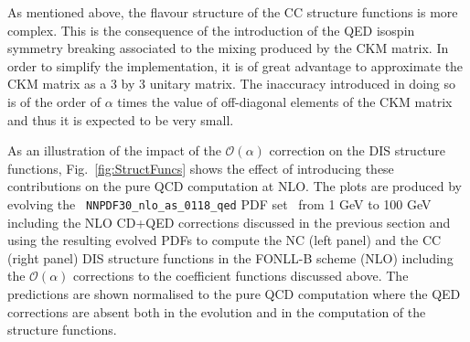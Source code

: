 As mentioned above, the flavour structure of the CC structure
functions is more complex. This is the consequence of the introduction
of the QED isospin symmetry breaking associated to the mixing produced
by the CKM matrix. In order to simplify the implementation, it is of
great advantage to approximate the CKM matrix as a 3 by 3 unitary
matrix. The inaccuracy introduced in doing so is of the order of
$\alpha$ times the value of off-diagonal elements of the CKM matrix
and thus it is expected to be very small.

As an illustration of the impact of the $\mathcal{O}(\alpha)$
correction on the DIS structure functions, Fig.~\ref{fig:StructFuncs}
shows the effect of introducing these contributions on the pure QCD
computation at NLO. The plots are produced by evolving the {\tt
  NNPDF30\_nlo\_as\_0118\_qed} PDF set~\cite{Bertone:2016ume} from 1
GeV to 100 GeV including the NLO CD+QED corrections discussed in the
previous section and using the resulting evolved PDFs to compute the
NC (left panel) and the CC (right panel) DIS structure functions in
the FONLL-B scheme (NLO) including the $\mathcal{O}(\alpha)$
corrections to the coefficient functions discussed above. The
predictions are shown normalised to the pure QCD computation where the
QED corrections are absent both in the evolution and in the
computation of the structure functions.

